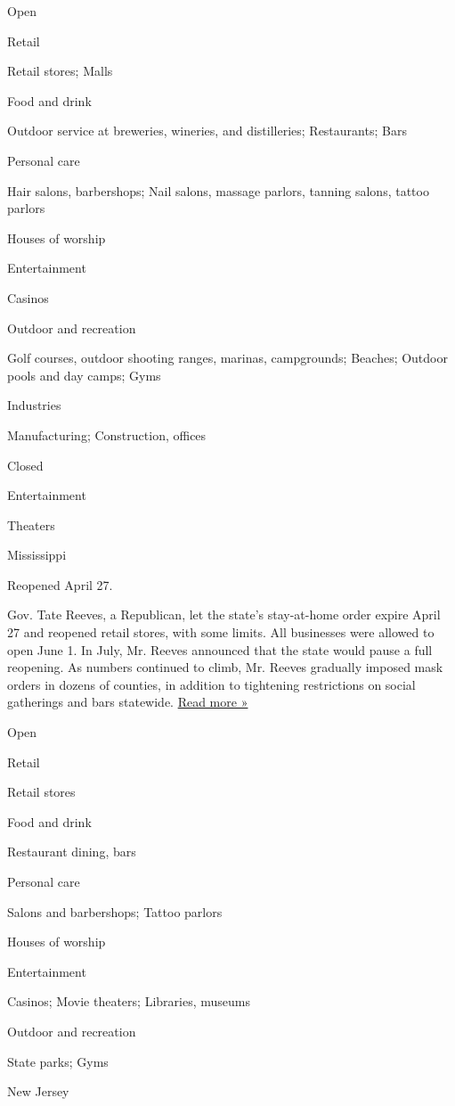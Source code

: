Open

Retail

Retail stores; Malls

Food and drink

Outdoor service at breweries, wineries, and distilleries; Restaurants;
Bars

Personal care

Hair salons, barbershops; Nail salons, massage parlors, tanning salons,
tattoo parlors

Houses of worship

Entertainment

Casinos

Outdoor and recreation

Golf courses, outdoor shooting ranges, marinas, campgrounds; Beaches;
Outdoor pools and day camps; Gyms

Industries

Manufacturing; Construction, offices

Closed

Entertainment

Theaters

Mississippi

Reopened April 27.

Gov. Tate Reeves, a Republican, let the state's stay-at-home order
expire April 27 and reopened retail stores, with some limits. All
businesses were allowed to open June 1. In July, Mr. Reeves announced
that the state would pause a full reopening. As numbers continued to
climb, Mr. Reeves gradually imposed mask orders in dozens of counties,
in addition to tightening restrictions on social gatherings and bars
statewide.
\href{https://www.sunherald.com/news/coronavirus/article244467187.html}{Read
more »}

Open

Retail

Retail stores

Food and drink

Restaurant dining, bars

Personal care

Salons and barbershops; Tattoo parlors

Houses of worship

Entertainment

Casinos; Movie theaters; Libraries, museums

Outdoor and recreation

State parks; Gyms

New Jersey

